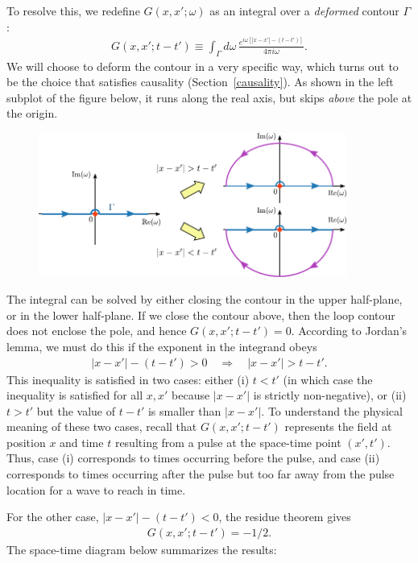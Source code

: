 \documentclass[10pt,a4paper]{article}
\begin{document}
To resolve this, we redefine $G(x,x';\omega)$ as an integral over a
\textit{deformed} contour $\Gamma$:
\begin{align}
  G(x,x';t-t') \equiv \int_\Gamma d\omega \, \frac{e^{i\omega \left[|x-x'| - (t-t')\right]}}{4\pi i\omega}.
\end{align}
We will choose to deform the contour in a very specific way, which
turns out to be the choice that satisfies causality
(Section~\ref{causality}).  As shown in the left subplot of the figure
below, it runs along the real axis, but skips \textit{above} the pole
at the origin.

\begin{figure}[ht]
  \centering\includegraphics[width=0.9\textwidth]{causality_contour}
\end{figure}

The integral can be solved by either closing the contour in the upper
half-plane, or in the lower half-plane. If we close the contour above,
then the loop contour does not enclose the pole, and hence
$G(x,x';t-t') = 0$. According to Jordan's lemma, we must do this if
the exponent in the integrand obeys
\begin{align}
  |x-x'| - (t-t') > 0  \quad \Rightarrow \quad |x-x'| > t-t'.
\end{align}
This inequality is satisfied in two cases: either (i) $t < t'$ (in
which case the inequality is satisfied for all $x,x'$ because $|x-x'|$
is strictly non-negative), or (ii) $t > t'$ but the value of $t-t'$ is
smaller than $|x-x'|$.  To understand the physical meaning of these
two cases, recall that $G(x,x';t-t')$ represents the field at position
$x$ and time $t$ resulting from a pulse at the space-time point
$(x',t')$.  Thus, case (i) corresponds to times occurring before the
pulse, and case (ii) corresponds to times occurring after the pulse
but too far away from the pulse location for a wave to reach in time.

For the other case, $|x-x'| - (t-t') < 0$, the residue theorem gives
\begin{align}
  G(x,x';t-t') = -1/2.
\end{align}
The space-time diagram below summarizes the results:
\end{document}
